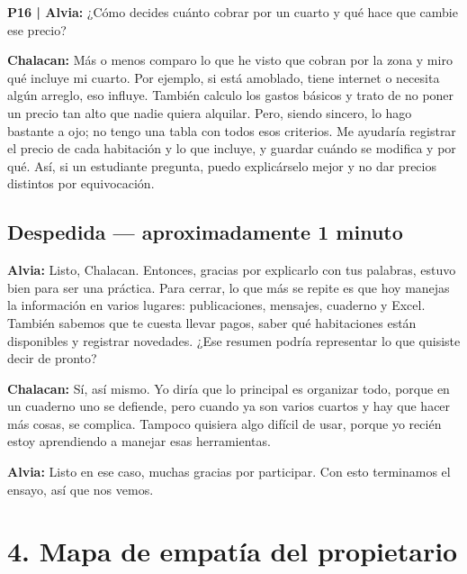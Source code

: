 \documentclass[11pt,a4paper]{article}
\newcommand{\habla}[2]{
    \par\noindent\hspace*{0.8em}\textbf{#1:} #2\par
}
\newcommand{\pregunta}[2]{
    \par\noindent\textbf{P#1 | Alvia:} #2\par
}
\begin{document}
\pregunta{16}{
¿Cómo decides cuánto cobrar por un cuarto y qué hace que cambie ese precio?
}

\habla{Chalacan}{
Más o menos comparo lo que he visto que cobran por la zona y miro qué incluye mi cuarto. Por ejemplo, si está amoblado, tiene internet o necesita algún arreglo, eso influye. También calculo los gastos básicos y trato de no poner un precio tan alto que nadie quiera alquilar. Pero, siendo sincero, lo hago bastante a ojo; no tengo una tabla con todos esos criterios. Me ayudaría registrar el precio de cada habitación y lo que incluye, y guardar cuándo se modifica y por qué. Así, si un estudiante pregunta, puedo explicárselo mejor y no dar precios distintos por equivocación.
}



\subsection*{Despedida — aproximadamente 1 minuto}

\habla{Alvia}{
Listo, Chalacan. Entonces, gracias por explicarlo con tus palabras, estuvo bien para ser una práctica. Para cerrar, lo que más se repite es que hoy manejas la información en varios lugares: publicaciones, mensajes, cuaderno y Excel. También sabemos que te cuesta llevar pagos, saber qué habitaciones están disponibles y registrar novedades. ¿Ese resumen podría representar lo que quisiste decir de pronto?
}

\habla{Chalacan}{
Sí, así mismo. Yo diría que lo principal es organizar todo, porque en un cuaderno uno se defiende, pero cuando ya son varios cuartos y hay que hacer más cosas, se complica. Tampoco quisiera algo difícil de usar, porque yo recién estoy aprendiendo a manejar esas herramientas.
}

\habla{Alvia}{
Listo en ese caso, muchas gracias por participar. Con esto terminamos el ensayo, así que nos vemos.
}




\clearpage

\section*{4. Mapa de empatía del propietario}
\end{document}
